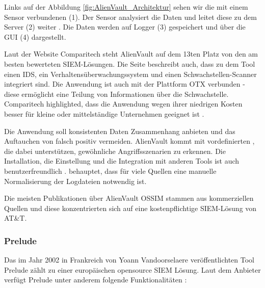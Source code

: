 
Links auf der Abbildung \ref{fig:AlienVault_Architektur} sehen wir die mit einem Sensor verbundenen  (1). Der Sensor analysiert die Daten und leitet diese zu dem Server (2) weiter \citep{AV_Sensor}. Die Daten werden auf Logger (3) gespeichert und über die \gls{GUI} (4) dargestellt.

Laut der Website Comparitech steht AlienVault auf dem 13ten Platz von den am besten bewerteten \gls{SIEM}-Lösungen. Die Seite beschreibt auch, dass zu dem Tool einen \gls{IDS}, ein Verhaltensüberwachungssystem und einen Schwachstellen-Scanner integriert sind. Die Anwendung ist auch mit der Plattform \gls{OTX} verbunden - diese ermöglicht eine Teilung von Informationen über die Schwachstelle. Comparitech highlighted, dass die Anwendung wegen ihrer niedrigen Kosten besser für kleine oder mittelständige Unternehmen geeignet ist \citep{comparitech_SIEM}.

Die Anwendung soll konsistenten Daten Zusammenhang anbieten und das Auftauchen von \gls{falsch positiv} vermeiden. AlienVault kommt mit vordefinierten , die dabei unterstützen, gewöhnliche Angriffsszenarien zu erkennen. Die Installation, die Einstellung und die Integration mit anderen Tools ist auch benutzerfreundlich \citep{Gomes_AV}. \cite{Nabil_AV} behauptet, dass für viele Quellen eine manuelle Normalisierung der Logdateien notwendig ist.


Die meisten Publikationen über AlienVault OSSIM stammen aus kommerziellen Quellen und diese konzentrierten sich auf eine kostenpflichtige \gls{SIEM}-Lösung von AT\&T.

\subsubsection{Prelude}
Das im Jahr 2002 in Frankreich von Yoann Vandoorselaere veröffentlichten Tool Prelude zählt zu einer europäischen \gls{opensource} \gls{SIEM} Lösung. Laut dem Anbieter verfügt Prelude unter anderem folgende Funktionalitäten \citep{Prelude_SIEM}:

